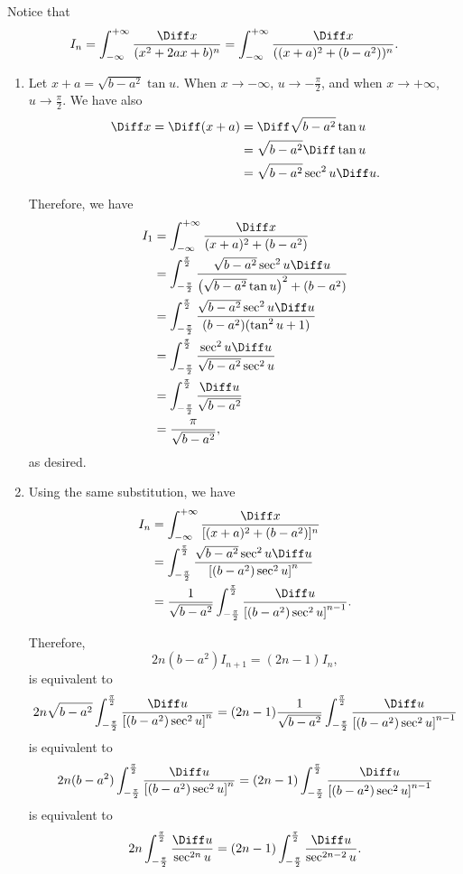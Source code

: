 \Question{\currfilebase}

Notice that
\[
I_n = \int_{-\infty}^{+\infty} \frac{\Diff x}{(x^2 + 2ax + b)^n} = \int_{-\infty}^{+\infty} \frac{\Diff x}{((x+a)^2 + (b - a^2))^n}.
\]

\begin{enumerate}
    \item Let \(x + a = \sqrt{b - a^2} \tan u\). When \(x \to -\infty\), \(u \to -\frac{\pi}{2}\), and when \(x \to +\infty\), \(u \to \frac{\pi}{2}\). We have also
    \begin{align*}
        \Diff x = \Diff (x+a) &= \Diff \sqrt{b - a^2} \tan u\\
        &= \sqrt{b - a^2} \Diff \tan u\\
        &= \sqrt{b - a^2} \sec^2 u \Diff u.
    \end{align*}

    Therefore, we have
    \begin{align*}
        I_1 &= \int_{-\infty}^{+\infty} \frac{\Diff x}{(x+a)^2 + (b - a^2)}\\
        &= \int_{-\frac{\pi}{2}}^{\frac{\pi}{2}} \frac{\sqrt{b - a^2} \sec^2 u \Diff u}{\left(\sqrt{b - a^2} \tan u\right)^2 + (b - a^2)}\\
        &= \int_{-\frac{\pi}{2}}^{\frac{\pi}{2}} \frac{\sqrt{b - a^2} \sec^2 u \Diff u}{(b - a^2)(\tan^2 u + 1)}\\
        &= \int_{-\frac{\pi}{2}}^{\frac{\pi}{2}} \frac{\sec^2 u \Diff u}{\sqrt{b - a^2}\sec^2 u}\\
        &= \int_{-\frac{\pi}{2}}^{\frac{\pi}{2}} \frac{\Diff u}{\sqrt{b - a^2}}\\
        &= \frac{\pi}{\sqrt{b - a^2}},
    \end{align*}
    as desired.

    \item Using the same substitution, we have
    \begin{align*}
        I_n &= \int_{-\infty}^{+\infty} \frac{\Diff x}{[(x+a)^2 + (b - a^2)]^n}\\
        &= \int_{-\frac{\pi}{2}}^{\frac{\pi}{2}} \frac{\sqrt{b - a^2} \sec^2 u \Diff u}{\left[(b - a^2) \sec^2 u\right]^n}\\
        &= \frac{1}{\sqrt{b - a^2}} \int_{-\frac{\pi}{2}}^{\frac{\pi}{2}} \frac{\Diff u}{\left[(b - a^2) \sec^2 u\right]^{n - 1}}.
    \end{align*}

    Therefore,
    \[
        2n(b - a^2) I_{n + 1} = (2n - 1) I_n,
    \]
    is equivalent to
    \[
        2n \sqrt{b - a^2} \int_{-\frac{\pi}{2}}^{\frac{\pi}{2}} \frac{\Diff u}{\left[(b - a^2) \sec^2 u\right]^{n}} = (2n-1) \frac{1}{\sqrt{b - a^2}} \int_{-\frac{\pi}{2}}^{\frac{\pi}{2}} \frac{\Diff u}{\left[(b - a^2) \sec^2 u\right]^{n - 1}}
    \]
    is equivalent to
    \[
        2n (b - a^2) \int_{-\frac{\pi}{2}}^{\frac{\pi}{2}} \frac{\Diff u}{\left[(b - a^2) \sec^2 u\right]^{n}} = (2n-1) \int_{-\frac{\pi}{2}}^{\frac{\pi}{2}} \frac{\Diff u}{\left[(b - a^2) \sec^2 u\right]^{n - 1}}
    \]
    is equivalent to
    \[
        2n \int_{- \frac{\pi}{2}}^{\frac{\pi}{2}} \frac{\Diff u}{\sec^{2n} u} = (2n - 1) \int_{- \frac{\pi}{2}}^{\frac{\pi}{2}} \frac{\Diff u}{\sec^{2n - 2} u}.
    \]


\end{enumerate}

